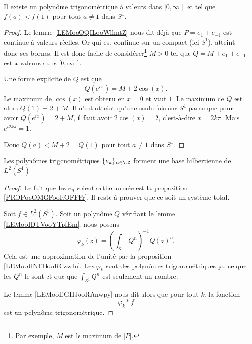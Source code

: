\begin{lemma}       \label{LEMooIDTVooYTpfEm}
	Il existe un polynôme trigonométrique à valeurs dans \( \mathopen[ 0 , \infty \mathclose[\) et tel que \( f(a)<f(1)\) pour tout \( a\neq 1\) dans \( S^1\).
\end{lemma}

\begin{proof}
	Le lemme \ref{LEMooQQILooWlhntZ} nous dit déjà que \( P=e_1+e_{-1}\) est continue à valeurs réelles. Or qui est continue sur un compact (ici \( S^1\)), atteint donc ses bornes. Il est donc facile de considérer\footnote{Par exemple, \( M\) est le maximum de \( | P |\).} \( M>0\) tel que \( Q=M+e_1+e_{-1}\) est à valeurs dans \( \mathopen[ 0 , \infty \mathclose[\).

	Une forme explicite de \( Q\) est que
	\begin{equation}
		Q( e^{ix})=M+2\cos(x).
	\end{equation}
	Le maximum de \( \cos(x)\) est obtenu en \( x=0\) et vaut \( 1\). Le maximum de \( Q\) est alors \( Q(1)=2+M\). Il n'est atteint qu'une seule fois sur \( S^1\) parce que pour avoir \( Q( e^{ix})=2+M\), il faut avoir \( 2\cos(x)=2\), c'est-à-dire \( x=2k\pi\). Mais \(  e^{i2k\pi}=1\).

	Donc \( Q(a)<M+2=Q(1)\) pour tout \( a\neq 1\) dans \( S^1\).
\end{proof}

\begin{proposition}
	Les polynômes trigonométriques \( \{ e_n \}_{n\in \eZ}\) forment une base hilbertienne de \( L^2(S^1)\).
\end{proposition}

\begin{proof}
	Le fait que les \( e_n\) soient orthonormée est la proposition \ref{PROPooOMGFooROFFFr}. Il reste à prouver que ce soit un système total.

	Soit \( f\in L^2(S^1)\). Soit un polynôme \( Q\) vérifiant le lemme \ref{LEMooIDTVooYTpfEm}; nous posons
	\begin{equation}
		\varphi_k(z)=\left( \int_{S^1}Q^n \right)^{-1}Q(z)^n.
	\end{equation}
	Cela est une approximation de l'unité par la proposition \ref{LEMooUNFBooRCzwIn}. Les \( \varphi_k\) sont des polynômes trigonométriques parce que les \( Q^n\) le sont et que que \( \int_{S^1}Q^n\) est seulement un nombre.

	Le lemme \ref{LEMooDGHJooRAnwpy} nous dit alors que pour tout \( k\), la fonction
	\begin{equation}
		\varphi_k*f
	\end{equation}
	est un polynôme trigonométrique.
\end{proof}

